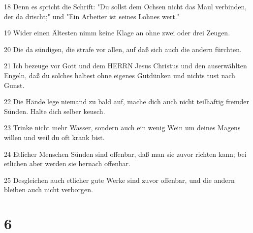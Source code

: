\par 18 Denn es spricht die Schrift: "Du sollst dem Ochsen nicht das Maul verbinden, der da drischt;" und "Ein Arbeiter ist seines Lohnes wert."
\par 19 Wider einen Ältesten nimm keine Klage an ohne zwei oder drei Zeugen.
\par 20 Die da sündigen, die strafe vor allen, auf daß sich auch die andern fürchten.
\par 21 Ich bezeuge vor Gott und dem HERRN Jesus Christus und den auserwählten Engeln, daß du solches haltest ohne eigenes Gutdünken und nichts tust nach Gunst.
\par 22 Die Hände lege niemand zu bald auf, mache dich auch nicht teilhaftig fremder Sünden. Halte dich selber keusch.
\par 23 Trinke nicht mehr Wasser, sondern auch ein wenig Wein um deines Magens willen und weil du oft krank bist.
\par 24 Etlicher Menschen Sünden sind offenbar, daß man sie zuvor richten kann; bei etlichen aber werden sie hernach offenbar.
\par 25 Desgleichen auch etlicher gute Werke sind zuvor offenbar, und die andern bleiben auch nicht verborgen.

\chapter{6}

